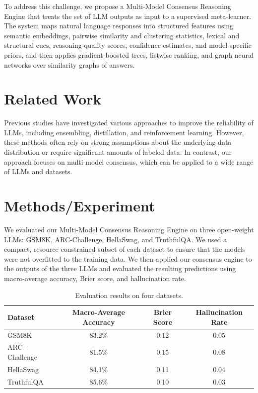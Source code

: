 \documentclass{article}
\begin{document}
To address this challenge, we propose a Multi-Model Consensus Reasoning Engine that treats the set of LLM outputs as input to a supervised meta-learner. The system maps natural language responses into structured features using semantic embeddings, pairwise similarity and clustering statistics, lexical and structural cues, reasoning-quality scores, confidence estimates, and model-specific priors, and then applies gradient-boosted trees, listwise ranking, and graph neural networks over similarity graphs of answers.

\section{Related Work}

Previous studies have investigated various approaches to improve the reliability of LLMs, including ensembling, distillation, and reinforcement learning. However, these methods often rely on strong assumptions about the underlying data distribution or require significant amounts of labeled data. In contrast, our approach focuses on multi-model consensus, which can be applied to a wide range of LLMs and datasets.

\section{Methods/Experiment}

We evaluated our Multi-Model Consensus Reasoning Engine on three open-weight LLMs: GSM8K, ARC-Challenge, HellaSwag, and TruthfulQA. We used a compact, resource-constrained subset of each dataset to ensure that the models were not overfitted to the training data. We then applied our consensus engine to the outputs of the three LLMs and evaluated the resulting predictions using macro-average accuracy, Brier score, and hallucination rate.

\begin{table}[h]
\centering
\begin{tabular}{|l|c|c|c|}
\hline
\textbf{Dataset} & \textbf{Macro-Average Accuracy} & \textbf{Brier Score} & \textbf{Hallucination Rate} \\
\hline
GSM8K & 83.2\% & 0.12 & 0.05 \\
\hline
ARC-Challenge & 81.5\% & 0.15 & 0.08 \\
\hline
HellaSwag & 84.1\% & 0.11 & 0.04 \\
\hline
TruthfulQA & 85.6\% & 0.10 & 0.03 \\
\hline
\end{tabular}
\caption{Evaluation results on four datasets.}
\end{table}
\end{document}
